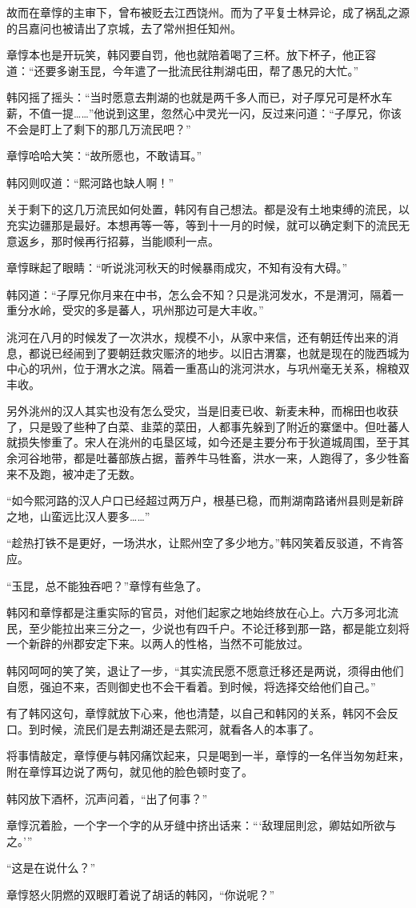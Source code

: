 故而在章惇的主审下，曾布被贬去江西饶州。而为了平复士林异论，成了祸乱之源的吕嘉问也被请出了京城，去了常州担任知州。

章惇本也是开玩笑，韩冈要自罚，他也就陪着喝了三杯。放下杯子，他正容道：“还要多谢玉昆，今年遣了一批流民往荆湖屯田，帮了愚兄的大忙。”

韩冈摇了摇头：“当时愿意去荆湖的也就是两千多人而已，对子厚兄可是杯水车薪，不值一提……”他说到这里，忽然心中灵光一闪，反过来问道：“子厚兄，你该不会是盯上了剩下的那几万流民吧？”

章惇哈哈大笑：“故所愿也，不敢请耳。”

韩冈则叹道：“熙河路也缺人啊！”

关于剩下的这几万流民如何处置，韩冈有自己想法。都是没有土地束缚的流民，以充实边疆那是最好。本想再等一等，等到十一月的时候，就可以确定剩下的流民无意返乡，那时候再行招募，当能顺利一点。

章惇眯起了眼睛：“听说洮河秋天的时候暴雨成灾，不知有没有大碍。”

韩冈道：“子厚兄你月来在中书，怎么会不知？只是洮河发水，不是渭河，隔着一重分水岭，受灾的多是蕃人，巩州那边可是大丰收。”

洮河在八月的时候发了一次洪水，规模不小，从家中来信，还有朝廷传出来的消息，都说已经闹到了要朝廷救灾赈济的地步。以旧古渭寨，也就是现在的陇西城为中心的巩州，位于渭水之滨。隔着一重髙山的洮河洪水，与巩州毫无关系，棉粮双丰收。

另外洮州的汉人其实也没有怎么受灾，当是旧麦已收、新麦未种，而棉田也收获了，只是毁了些种了白菜、韭菜的菜田，人都事先躲到了附近的寨堡中。但吐蕃人就损失惨重了。宋人在洮州的屯垦区域，如今还是主要分布于狄道城周围，至于其余河谷地带，都是吐蕃部族占据，蓄养牛马牲畜，洪水一来，人跑得了，多少牲畜来不及跑，被冲走了无数。

“如今熙河路的汉人户口已经超过两万户，根基已稳，而荆湖南路诸州县则是新辟之地，山蛮远比汉人要多……”

“趁热打铁不是更好，一场洪水，让熙州空了多少地方。”韩冈笑着反驳道，不肯答应。

“玉昆，总不能独吞吧？”章惇有些急了。

韩冈和章惇都是注重实际的官员，对他们起家之地始终放在心上。六万多河北流民，至少能拉出来三分之一，少说也有四千户。不论迁移到那一路，都是能立刻将一个新辟的州郡安定下来。以两人的性格，当然不可能放过。

韩冈呵呵的笑了笑，退让了一步，“其实流民愿不愿意迁移还是两说，须得由他们自愿，强迫不来，否则御史也不会干看着。到时候，将选择交给他们自己。”

有了韩冈这句，章惇就放下心来，他也清楚，以自己和韩冈的关系，韩冈不会反口。到时候，流民们是去荆湖还是去熙河，就看各人的本事了。

将事情敲定，章惇便与韩冈痛饮起来，只是喝到一半，章惇的一名伴当匆匆赶来，附在章惇耳边说了两句，就见他的脸色顿时变了。

韩冈放下酒杯，沉声问着，“出了何事？”

章惇沉着脸，一个字一个字的从牙缝中挤出话来：“‘敌理屈則忿，卿姑如所欲与之。’”

“这是在说什么？”

章惇怒火阴燃的双眼盯着说了胡话的韩冈，“你说呢？”

